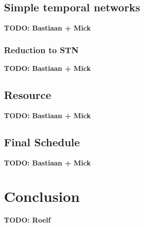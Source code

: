 \documentclass{article}
\newcommand{\TODO}[1]{{\color{red}\textbf{TODO: #1}}}
\begin{document}
\subsection{Simple temporal networks}

\TODO{Bastiaan + Mick}


\subsubsection{Reduction to STN}

\TODO{Bastiaan + Mick}


\subsection{Resource}

\TODO{Bastiaan + Mick}

\subsection{Final Schedule}

\TODO{Bastiaan + Mick}


\newpage


\section{Conclusion}

\TODO{Roelf}


\citet{brucker99}

\citet{herroelen05}

\citet{policella07}

\citet{lombardi10}

\citet{cesta98}

\citet{deblaere10}


\newpage


\end{document}
